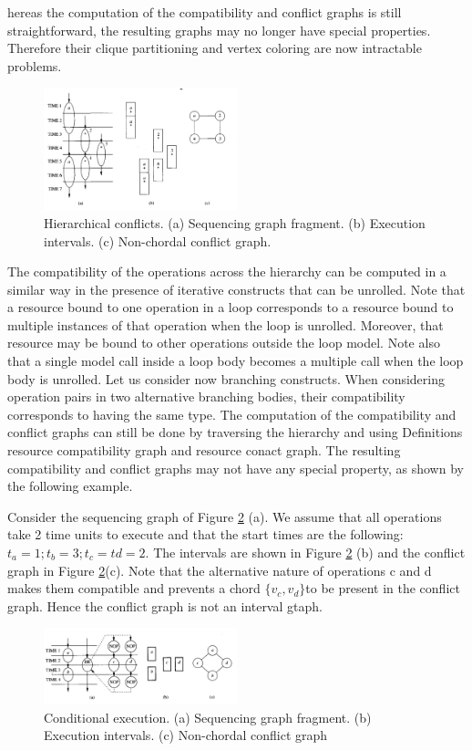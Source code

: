 hereas the computation of the compatibility and conflict graphs is still straightforward, the resulting graphs may no longer have special properties. Therefore their clique partitioning and vertex coloring are now intractable problems. 

\begin{figure}[h]
    \centering
    \includegraphics[width=0.5\textwidth]{Hierarchical_conflicts}
    \caption{Hierarchical conflicts. (a) Sequencing graph fragment. (b) Execution intervals. (c) Non-chordal conflict graph. \cite{b1}}
    \label{fig:Hierarchical_conflicts}
\end{figure}


The compatibility of the operations across the hierarchy can be computed in a similar way in the presence of iterative constructs that can be unrolled. Note that a resource bound to one operation in a loop corresponds to a resource bound to multiple instances of that operation when the loop is unrolled. Moreover, that resource may be bound to other operations outside the loop model. Note also that a single model call inside a loop body becomes a multiple call when the loop body is unrolled. Let us consider now branching constructs. When considering operation pairs in two alternative branching bodies, their compatibility corresponds to having the same type. The computation of the compatibility and conflict graphs can still be done by traversing the hierarchy and using Definitions  resource compatibility graph and resource conact graph. The resulting compatibility and conflict graphs may not have any special property, as shown by the following example. 

Consider the sequencing graph of Figure \ref{fig:Conditional_execution} (a). We assume that all operations take 2 time units to execute and that the start times are the following: 
$ t_{a}=1;t_{b}=3;t_{c}=t{d}=2 $. The intervals are shown in Figure \ref{fig:Conditional_execution} (b) and the conflict graph in Figure \ref{fig:Conditional_execution}(c). Note that the alternative nature of operations c and d makes them compatible and prevents a chord $ \{v_{c},v_{d}\} $to be present in the conflict graph. Hence the conflict graph is not an interval gtaph. 


\begin{figure}[h]
    \centering
    \includegraphics[width=0.5\textwidth]{Conditional_execution}
    \caption{ Conditional execution. (a) Sequencing graph fragment. (b) Execution intervals. (c) Non-chordal conflict graph \cite{b1}}
    \label{fig:Conditional_execution}
\end{figure}